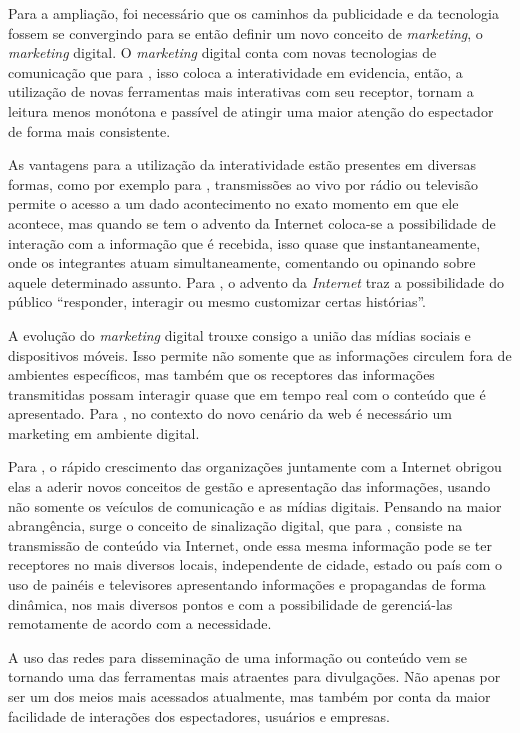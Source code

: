 Para a ampliação, foi necessário que os caminhos da publicidade e da tecnologia fossem se convergindo para se então definir um novo conceito de \textit{marketing}, o \textit{marketing} digital. O \textit{marketing} digital conta com novas tecnologias de comunicação que para \cite[p.2]{escobar2007}, isso coloca a interatividade em evidencia, então, a utilização de novas ferramentas mais interativas com seu receptor, tornam a leitura menos monótona e passível de atingir uma maior atenção do espectador de forma mais consistente.  

As vantagens para a utilização da interatividade estão presentes em diversas formas, como por exemplo para \cite[p.4]{escobar2007}, transmissões ao vivo por rádio ou televisão permite o acesso a um dado acontecimento no exato momento em que ele acontece, mas quando se tem o advento da Internet coloca-se a possibilidade de interação com a informação que é recebida, isso quase que instantaneamente, onde os integrantes atuam simultaneamente, comentando ou opinando sobre aquele determinado assunto. Para \cite{deuze2002}, o advento da \textit{Internet} traz a possibilidade do público ``responder, interagir ou mesmo customizar certas histórias''. 

A evolução do \textit{marketing} digital trouxe consigo a união das mídias sociais e dispositivos móveis. Isso permite não somente que as informações circulem fora de ambientes específicos, mas também que os receptores das informações transmitidas possam interagir quase que em tempo real com o conteúdo que é apresentado. Para \cite{santos2014}, no contexto do novo cenário da web é necessário um marketing em ambiente digital.

Para \cite[p.7]{machado2010}, o rápido crescimento das organizações juntamente com a Internet obrigou elas a aderir novos conceitos de gestão e apresentação das informações, usando não somente os veículos de comunicação e as mídias digitais. Pensando na maior abrangência, surge o conceito de sinalização digital, que para \cite[p.37]{machado2010}, consiste na transmissão de conteúdo via Internet, onde essa mesma informação pode se ter receptores no mais diversos locais, independente de cidade, estado ou país com o uso de painéis e televisores apresentando informações e propagandas de forma dinâmica, nos mais diversos pontos e com a possibilidade de gerenciá-las remotamente de acordo com a necessidade. 

A uso das redes para disseminação de uma informação ou conteúdo vem se tornando uma das ferramentas mais atraentes para divulgações. Não apenas por ser um dos meios mais acessados atualmente, mas também por conta da maior facilidade de interações dos espectadores, usuários e empresas. 

